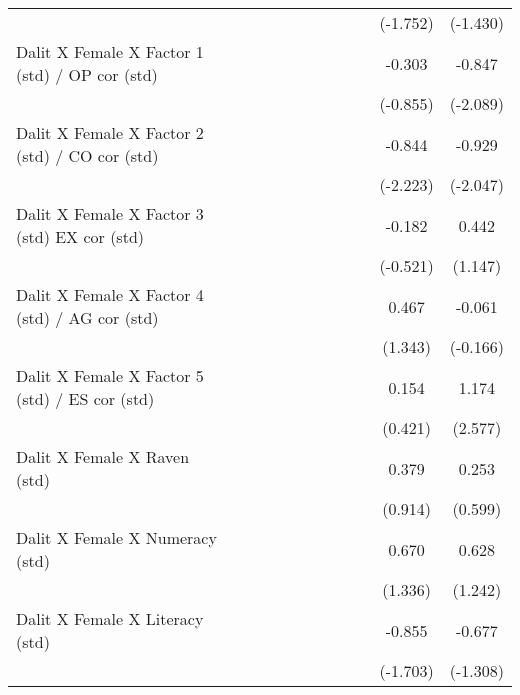 {\begin{longtable}{@{\extracolsep{\fill}}lccccccccccc}
          &       &       &       &       &       &       &       &       &       & (-1.752) & (-1.430) \\
    Dalit X Female X Factor 1 (std) / OP cor (std) &       &       &       &       &       &       &       &       &       & -0.303 & -0.847 \\
          &       &       &       &       &       &       &       &       &       & (-0.855) & (-2.089) \\
    Dalit X Female X Factor 2 (std) / CO cor (std) &       &       &       &       &       &       &       &       &       & -0.844 & -0.929 \\
          &       &       &       &       &       &       &       &       &       & (-2.223) & (-2.047) \\
    Dalit X Female X Factor 3 (std) EX cor (std) &       &       &       &       &       &       &       &       &       & -0.182 & 0.442 \\
          &       &       &       &       &       &       &       &       &       & (-0.521) & (1.147) \\
    Dalit X Female X Factor 4 (std) / AG cor (std) &       &       &       &       &       &       &       &       &       & 0.467 & -0.061 \\
          &       &       &       &       &       &       &       &       &       & (1.343) & (-0.166) \\
    Dalit X Female X Factor 5 (std) / ES cor (std) &       &       &       &       &       &       &       &       &       & 0.154 & 1.174 \\
          &       &       &       &       &       &       &       &       &       & (0.421) & (2.577) \\
    Dalit X Female X Raven (std) &       &       &       &       &       &       &       &       &       & 0.379 & 0.253 \\
          &       &       &       &       &       &       &       &       &       & (0.914) & (0.599) \\
    Dalit X Female X Numeracy (std) &       &       &       &       &       &       &       &       &       & 0.670 & 0.628 \\
          &       &       &       &       &       &       &       &       &       & (1.336) & (1.242) \\
    Dalit X Female X Literacy (std) &       &       &       &       &       &       &       &       &       & -0.855 & -0.677 \\
          &       &       &       &       &       &       &       &       &       & (-1.703) & (-1.308) \\

\end{longtable}}
